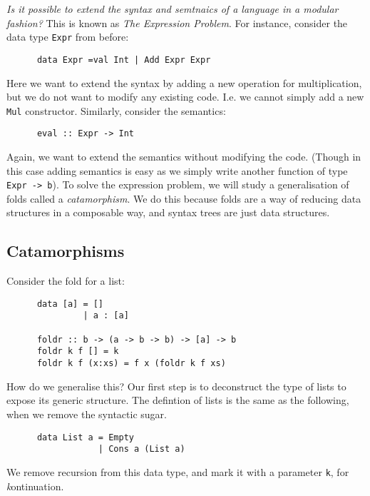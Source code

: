 \documentclass[a4paper,12pt]{article}
\theoremstyle{remark}
\begin{document}
  \textit{Is it possible to extend the syntax and semtnaics of a language in a
  modular fashion?} This is known as \textit{The Expression Problem}. For instance,
  consider the data type \lstinline{Expr} from before:

  \begin{lstlisting}
      data Expr =val Int | Add Expr Expr  \end{lstlisting}

  Here we want to extend the syntax by adding a new operation for multiplication,
  but we do not want to modify any existing code. I.e. we cannot simply add a new
  \lstinline{Mul} constructor. Similarly, consider the semantics:

  \begin{lstlisting}
      eval :: Expr -> Int  \end{lstlisting}

  Again, we want to extend the semantics without modifying the code. (Though in this
  case adding semantics is easy as we simply write another function of type \lstinline{Expr -> b}).
  To solve the expression problem, we will study a generalisation of folds called
  a \textit{catamorphism}. We do this because folds are a way of reducing data structures in a
  composable way, and syntax trees are just data structures.

  \subsection{Catamorphisms}

  Consider the fold for a list:

  \begin{lstlisting}
      data [a] = []
               | a : [a]

      foldr :: b -> (a -> b -> b) -> [a] -> b
      foldr k f [] = k
      foldr k f (x:xs) = f x (foldr k f xs)  \end{lstlisting}

  How do we generalise this? Our first step is to deconstruct the type of lists to expose its generic structure.
  The defintion of lists is the same as the following, when we remove the syntactic sugar.

  \begin{lstlisting}
      data List a = Empty
                  | Cons a (List a)  \end{lstlisting}

  We remove recursion from this data type, and mark it with a parameter \lstinline{k},
  for \textit{k}ontinuation.
\end{document}
